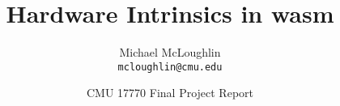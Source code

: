 \documentclass{article}
\newcommand{\wasml}{\acl{wasm}\xspace}
\begin{document}
\title{Hardware Intrinsics in \wasml}
\author{Michael McLoughlin \\ \texttt{mcloughlin@cmu.edu}}
\date{CMU 17770 Final Project Report}
\maketitle

\setcounter{tocdepth}{2}
\tableofcontents









\appendix


\printbibliography
\end{document}
